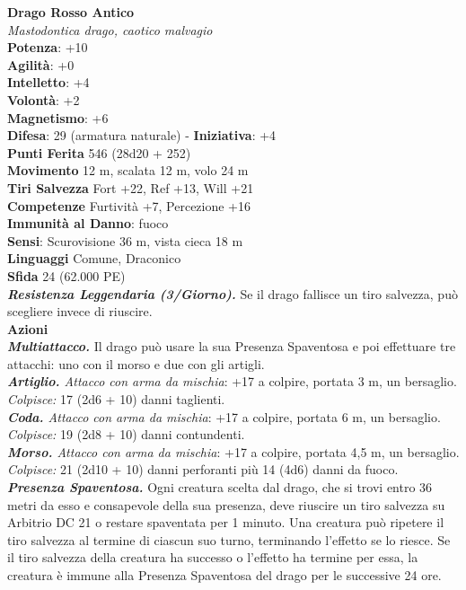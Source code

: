 \begin{multicols}{2}
\medskip\textbf{Drago Rosso Antico}\\
\emph{Mastodontica drago, caotico malvagio}\\
\textbf{Potenza}: +10\\
\textbf{Agilità}: +0\\
\textbf{Intelletto}: +4\\
\textbf{Volontà}: +2\\
\textbf{Magnetismo}: +6\\
\textbf{Difesa}: 29 (armatura naturale) - \textbf{Iniziativa}: +4\\
\textbf{Punti Ferita} 546 (28d20 + 252)\\
\textbf{Movimento} 12 m, scalata 12 m, volo 24 m\\
\textbf{Tiri Salvezza} Fort +22, Ref +13, Will +21\\
\textbf{Competenze} Furtività +7, Percezione +16\\
\textbf{Immunità al Danno}: fuoco\\
\textbf{Sensi}: Scurovisione 36 m, vista cieca 18 m\\
\textbf{Linguaggi} Comune, Draconico\\
\textbf{Sfida} 24 (62.000 PE)\smallskip\\
\emph{\textbf{Resistenza Leggendaria (3/Giorno).}} Se il drago fallisce un tiro salvezza, può scegliere invece di riuscire.\\
\smallskip\textbf{Azioni}\\
\emph{\textbf{Multiattacco.}} Il drago può usare la sua Presenza Spaventosa e poi effettuare tre attacchi: uno con il morso e due con gli artigli.\\
\emph{\textbf{Artiglio.} Attacco con arma da mischia}: +17 a colpire, portata 3 m, un bersaglio.\\
\emph{Colpisce:} 17 (2d6 + 10) danni taglienti.\\
\emph{\textbf{Coda.} Attacco con arma da mischia}: +17 a colpire, portata 6 m, un bersaglio.\\
\emph{Colpisce:} 19 (2d8 + 10) danni contundenti.\\
\emph{\textbf{Morso.} Attacco con arma da mischia}: +17 a colpire, portata 4,5 m, un bersaglio.\\
\emph{Colpisce:} 21 (2d10 + 10) danni perforanti più 14 (4d6) danni da fuoco.\\
\emph{\textbf{Presenza Spaventosa.}} Ogni creatura scelta dal drago, che si trovi entro 36 metri da esso e consapevole della sua presenza, deve riuscire un tiro salvezza su Arbitrio DC 21 o restare spaventata per 1 minuto. Una creatura può ripetere il tiro salvezza al termine di ciascun suo turno, terminando l'effetto se lo riesce. Se il tiro salvezza della creatura ha successo o l'effetto ha termine per essa, la creatura è immune alla Presenza Spaventosa del drago per le successive 24 ore.\\

\end{multicols}
